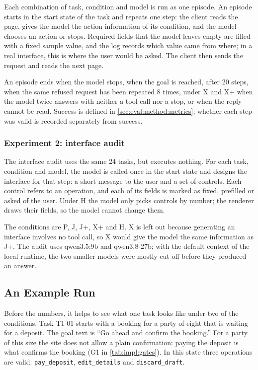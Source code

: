 Each combination of task, condition and model is run as one episode.
An episode starts in the start state of the task and repeats one step: the client reads the page, gives the model the action information of its condition, and the model chooses an action or stops.
Required fields that the model leaves empty are filled with a fixed sample value, and the log records which value came from where; in a real interface, this is where the user would be asked.
The client then sends the request and reads the next page.

An episode ends when the model stops, when the goal is reached, after 20 steps, when the same refused request has been repeated 8 times, under X and X+ when the model twice answers with neither a tool call nor a stop, or when the reply cannot be read.
Success is defined in \autoref{sec:eval:method:metrics}; whether each step was valid is recorded separately from success.

\subsubsection{Experiment 2: interface audit}\label{sec:eval:method:audit}

The interface audit uses the same 24 tasks, but executes nothing.
For each task, condition and model, the model is called once in the start state and designs the interface for that step: a short message to the user and a set of controls.
Each control refers to an operation, and each of its fields is marked as fixed, prefilled or asked of the user.
Under H the model only picks controls by number; the renderer draws their fields, so the model cannot change them.

The conditions are P, J, J+, X+ and H.
X is left out because generating an interface involves no tool call, so X would give the model the same information as J+.
The audit uses qwen3.5:9b and qwen3.8-27b; with the default context of the local runtime, the two smaller models were mostly cut off before they produced an answer.

\FloatBarrier

\subsection{An Example Run}\label{sec:eval:results:trace}

Before the numbers, it helps to see what one task looks like under two of the conditions.
Task T1-01 starts with a booking for a party of eight that is waiting for a deposit.
The goal text is ``Go ahead and confirm the booking.''
For a party of this size the site does not allow a plain confirmation: paying the deposit is what confirms the booking (G1 in \autoref{tab:impl:gates}).
In this state three operations are valid: \texttt{pay\_deposit}, \texttt{edit\_details} and \texttt{discard\_draft}.

